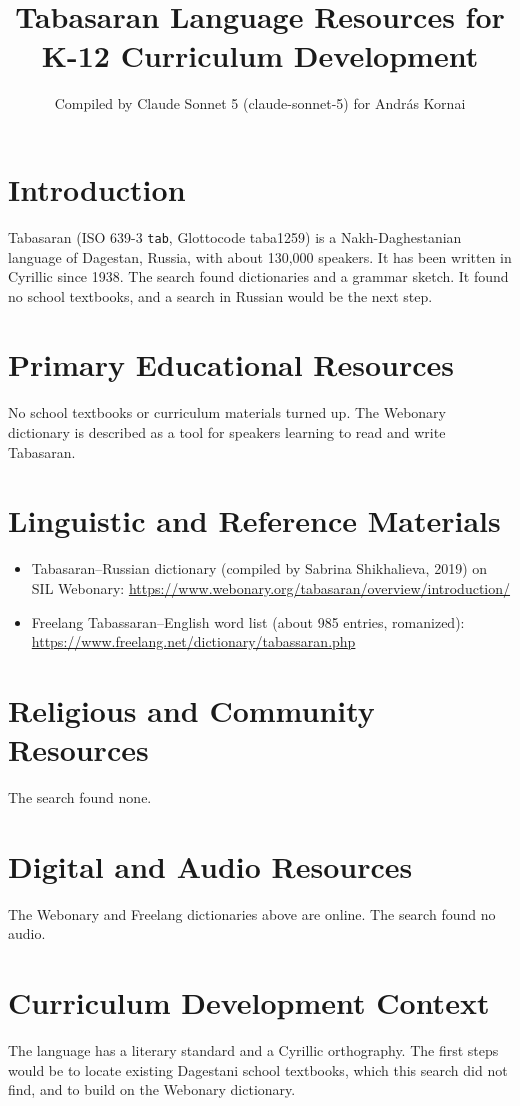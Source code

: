 \documentclass[12pt]{article}
\title{Tabasaran Language Resources for K-12 Curriculum Development}
\author{Compiled by Claude Sonnet 5 (claude-sonnet-5) for Andr\'as Kornai}
\date{}
\begin{document}
\maketitle

\section{Introduction}
Tabasaran (ISO 639-3 \texttt{tab}, Glottocode taba1259) is a Nakh-Daghestanian language of Dagestan, Russia, with about 130,000 speakers. It has been written in Cyrillic since 1938. The search found dictionaries and a grammar sketch. It found no school textbooks, and a search in Russian would be the next step.

\section{Primary Educational Resources}
No school textbooks or curriculum materials turned up. The Webonary dictionary is described as a tool for speakers learning to read and write Tabasaran.

\section{Linguistic and Reference Materials}
\begin{itemize}
\item Tabasaran--Russian dictionary (compiled by Sabrina Shikhalieva, 2019) on SIL Webonary: \url{https://www.webonary.org/tabasaran/overview/introduction/}
\item Freelang Tabassaran--English word list (about 985 entries, romanized): \url{https://www.freelang.net/dictionary/tabassaran.php}
\end{itemize}

\section{Religious and Community Resources}
The search found none.

\section{Digital and Audio Resources}
The Webonary and Freelang dictionaries above are online. The search found no audio.

\section{Curriculum Development Context}
The language has a literary standard and a Cyrillic orthography. The first steps would be to locate existing Dagestani school textbooks, which this search did not find, and to build on the Webonary dictionary.
\end{document}
